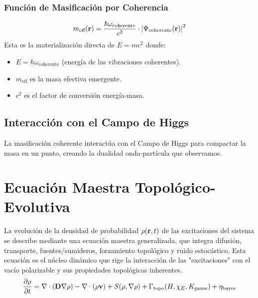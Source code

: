\documentclass[11pt, a4paper]{article}
\begin{document}
\subsubsection{Función de Masificación por Coherencia}
\begin{equation}
m_{\text{eff}}(\vb{r}) = \frac{\hbar\omega_{\text{coherente}}}{c^2} \cdot \abs{\Psi_{\text{coherente}}(\vb{r})}^2
\end{equation}
Esta es la materialización directa de \(E=mc^2\) donde:
\begin{itemize}
    \item \(E = \hbar\omega_{\text{coherente}}\) (energía de las vibraciones coherentes).
    \item \(m_{\text{eff}}\) es la masa efectiva emergente.
    \item \(c^2\) es el factor de conversión energía-masa.
\end{itemize}

\subsection{Interacción con el Campo de Higgs}
La masificación coherente interactúa con el Campo de Higgs para compactar la masa en un punto, creando la dualidad onda-partícula que observamos.

\section{Ecuación Maestra Topológico-Evolutiva}
La evolución de la densidad de probabilidad \(\rho(\vb{r},t)\) de las excitaciones del sistema se describe mediante una ecuación maestra generalizada, que integra difusión, transporte, fuentes/sumideros, forzamiento topológico y ruido estocástico. Esta ecuación es el núcleo dinámico que rige la interacción de las "excitaciones" con el vacío polarizable y sus propiedades topológicas inherentes.
\begin{equation}
\frac{\partial\rho}{\partial t} = \nabla\cdot(\vb{D}\nabla\rho) - \nabla\cdot(\rho\vb{v}) + S(\rho,\nabla\rho) + \Gamma_{\text{topo}}(H,\chi_E,K_{\text{gauss}}) + \eta_{\text{bayes}}
\end{equation}
\end{document}
